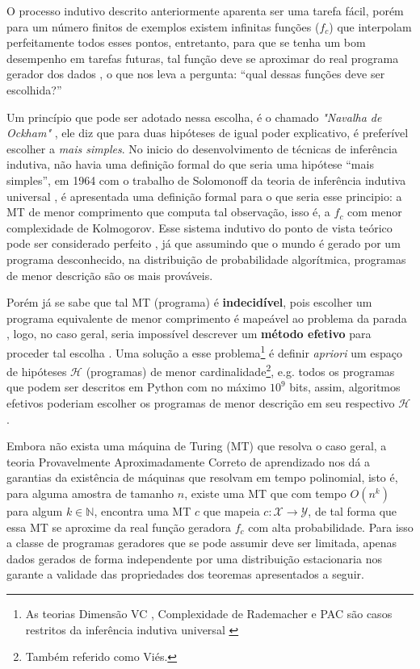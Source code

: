 O processo indutivo descrito anteriormente aparenta ser uma tarefa fácil, porém para um número finitos de exemplos existem infinitas funções ($f_c$) que interpolam perfeitamente todos esses pontos\cite{bishop2006pattern,abu2012learning}, entretanto, para que se tenha um bom desempenho em tarefas futuras, tal função deve se aproximar do real programa gerador dos dados \cite{mohri2018foundations,goodfellow2016deep,solomonoff1964formal,kearns1994introduction}, o que nos leva a pergunta: ``qual dessas funções deve ser escolhida?''

Um princípio que pode ser adotado nessa escolha, é o chamado \textit{"Navalha de Ockham"} \cite{blumer1987occam}, ele diz que para duas hipóteses de igual poder explicativo, é preferível escolher a \textit{mais simples}. No inicio do desenvolvimento de técnicas de inferência indutiva, não havia uma definição formal do que seria uma hipótese ``mais simples'', em 1964 com o trabalho de Solomonoff da teoria de inferência indutiva universal \cite{solomonoff1964formal}, é apresentada uma definição formal para o que seria esse principio: a MT de menor comprimento que computa tal observação, isso é, a $f_c$ com menor complexidade de Kolmogorov. Esse sistema indutivo do ponto de vista teórico pode ser considerado perfeito \cite{li1992inductive}, já que assumindo que o mundo é gerado por um programa desconhecido, na distribuição de probabilidade algorítmica, programas de menor descrição são os mais prováveis.

Porém já se sabe que tal MT (programa) é \textbf{indecidível}, pois escolher um programa equivalente de menor comprimento é mapeável ao problema da parada \cite{sipser2012introduction,solomonoff1978complexity}, logo, no caso geral, seria impossível descrever um \textbf{método efetivo} para proceder tal escolha \cite{hutter2004universal}. Uma solução a esse problema\footnote{As teorias Dimensão VC \cite{vapnik2013nature}, Complexidade de Rademacher \cite{bartlett2002rademacher} e PAC \cite{valiant1984theory} são casos restritos da inferência indutiva universal \cite{li1992inductive,blumer1989learnability}} é definir \textit{apriori} um espaço de hipóteses $\mathcal{H}$ (programas) de menor cardinalidade\footnote{Também referido como Viés.}, e.g. todos os programas que podem ser descritos em Python com no máximo $10^9$ bits, assim, algoritmos efetivos poderiam escolher os programas de menor descrição em seu respectivo $\mathcal{H}$ \cite{rathmanner2011philosophical}.

Embora não exista uma máquina de Turing (MT) que resolva o caso geral, a teoria Provavelmente Aproximadamente Correto de aprendizado nos dá a garantias da existência de máquinas que resolvam em tempo polinomial, isto é, para alguma amostra de tamanho $n$, existe uma MT que com tempo $O(n^k)$ para algum $k \in \mathbb{N}$, encontra uma MT $c$ que mapeia $c:\mathcal{X}\rightarrow\mathcal{Y}$, de tal forma que essa MT se aproxime da real função geradora $f_c$ com alta probabilidade. Para isso a classe de programas geradores que se pode assumir deve ser limitada, apenas dados gerados de forma independente por uma distribuição estacionaria nos garante a validade das propriedades dos teoremas apresentados a seguir.


